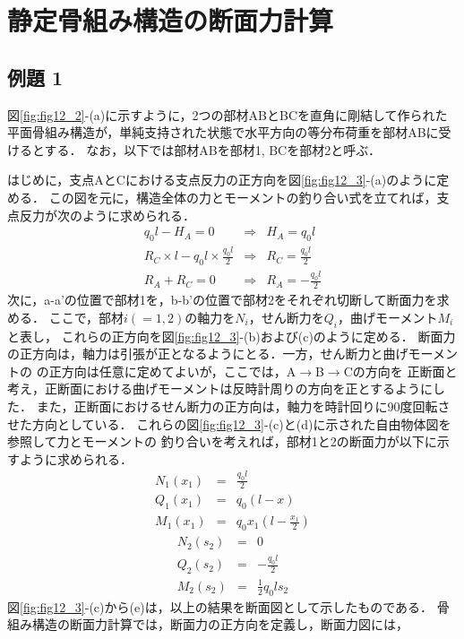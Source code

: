 \documentclass[10pt,a4j]{jarticle}
\begin{document}
\section{静定骨組み構造の断面力計算}
\subsection{例題 1}
図\ref{fig:fig12_2}-(a)に示すように，2つの部材ABとBCを直角に剛結して作られた
平面骨組み構造が，単純支持された状態で水平方向の等分布荷重を部材ABに受けるとする．
なお，以下では部材ABを部材1, BCを部材2と呼ぶ．

はじめに，支点AとCにおける支点反力の正方向を図\ref{fig:fig12_3}-(a)のように定める．
この図を元に，構造全体の力とモーメントの釣り合い式を立てれば，支点反力が次のように求められる．
\begin{eqnarray}
	q_0l-H_A=0 & \Rightarrow & H_A=q_0l \\ 
	R_C\times l -q_0l \times \frac{q_0l}{2}
	 & \Rightarrow & R_C=\frac{q_0l}{2} \\ 
	R_A+R_C=0 &\Rightarrow& R_A=-\frac{q_0l}{2}
\end{eqnarray}
次に，a-a'の位置で部材1を，b-b'の位置で部材2をそれぞれ切断して断面力を求める．
ここで，部材$i(=1,2)$の軸力を$N_i$，せん断力を$Q_i$，曲げモーメント$M_i$と表し，
これらの正方向を図\ref{fig:fig12_3}-(b)および(c)のように定める．
断面力の正方向は，軸力は引張が正となるようにとる．一方，せん断力と曲げモーメントの
の正方向は任意に定めてよいが，ここでは，A$\rightarrow$B$\rightarrow$Cの方向を
正断面と考え，正断面における曲げモーメントは反時計周りの方向を正とするようにした．
また，正断面におけるせん断力の正方向は，軸力を時計回りに90度回転させた方向としている．
これらの図\ref{fig:fig12_3}-(c)と(d)に示された自由物体図を参照して力とモーメントの
釣り合いを考えれば，部材1と2の断面力が以下に示すように求められる．
\begin{eqnarray}
	N_1(x_1) &= & \frac{q_0l}{2}  
	\\
	Q_1(x_1) &= & q_0(l-x)
	\\
	M_1(x_1) &= & q_0x_1\left(l-\frac{x_1}{2}\right)
\end{eqnarray}
\begin{eqnarray}
	N_2(s_2) &= & 0
	\\
	Q_2(s_2) &= & -\frac{q_0l}{2}
	\\
	M_2(s_2) &= & \frac{1}{2}q_0ls_2
\end{eqnarray}
図\ref{fig:fig12_3}-(c)から(e)は，以上の結果を断面図として示したものである．
骨組み構造の断面力計算では，断面力の正方向を定義し，断面力図には，
\end{document}
